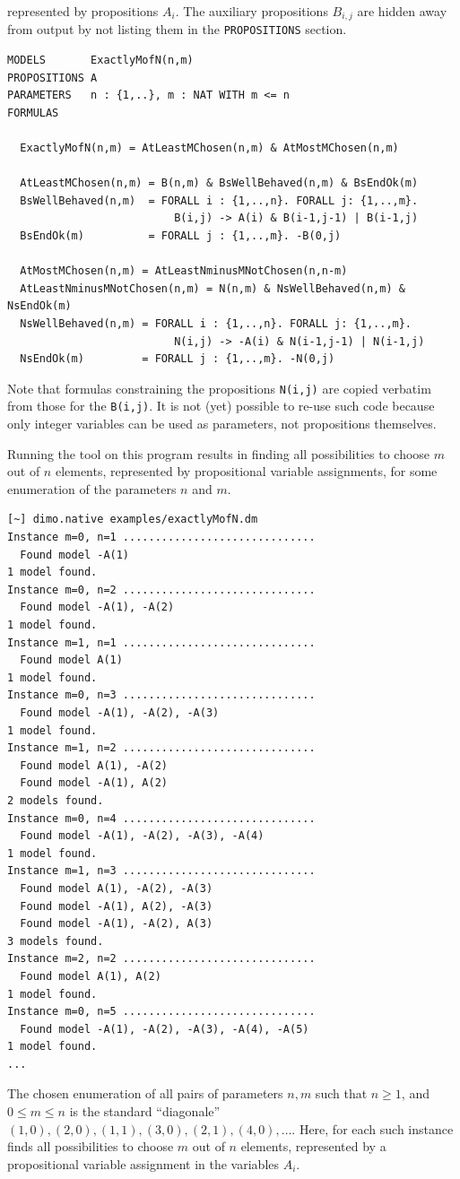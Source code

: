 \documentclass[twoside]{article}
\begin{document}
represented by propositions $A_i$. The auxiliary propositions $B_{i,j}$ are hidden away from output by not listing them in the \texttt{PROPOSITIONS}
section.
\begin{verbatim}
MODELS       ExactlyMofN(n,m)
PROPOSITIONS A
PARAMETERS   n : {1,..}, m : NAT WITH m <= n
FORMULAS

  ExactlyMofN(n,m) = AtLeastMChosen(n,m) & AtMostMChosen(n,m)

  AtLeastMChosen(n,m) = B(n,m) & BsWellBehaved(n,m) & BsEndOk(m)
  BsWellBehaved(n,m)  = FORALL i : {1,..,n}. FORALL j: {1,..,m}. 
                          B(i,j) -> A(i) & B(i-1,j-1) | B(i-1,j) 
  BsEndOk(m)          = FORALL j : {1,..,m}. -B(0,j)

  AtMostMChosen(n,m) = AtLeastNminusMNotChosen(n,n-m)
  AtLeastNminusMNotChosen(n,m) = N(n,m) & NsWellBehaved(n,m) & NsEndOk(m)
  NsWellBehaved(n,m) = FORALL i : {1,..,n}. FORALL j: {1,..,m}. 
                          N(i,j) -> -A(i) & N(i-1,j-1) | N(i-1,j)
  NsEndOk(m)         = FORALL j : {1,..,m}. -N(0,j)
\end{verbatim}
Note that formulas constraining the propositions \texttt{N(i,j)} are copied verbatim from those for the \texttt{B(i,j)}. It is not (yet) possible to
re-use such code because only integer variables can be used as parameters, not propositions themselves. 

Running the \DiMo tool on this program results in finding all possibilities to choose $m$ out of $n$ elements, represented by propositional variable
assignments, for some enumeration of the parameters $n$ and $m$.
\begin{verbatim}
[~] dimo.native examples/exactlyMofN.dm
Instance m=0, n=1 .............................. 
  Found model -A(1)
1 model found.
Instance m=0, n=2 .............................. 
  Found model -A(1), -A(2)
1 model found.
Instance m=1, n=1 .............................. 
  Found model A(1)
1 model found.
Instance m=0, n=3 .............................. 
  Found model -A(1), -A(2), -A(3)
1 model found.
Instance m=1, n=2 .............................. 
  Found model A(1), -A(2)
  Found model -A(1), A(2)
2 models found.
Instance m=0, n=4 .............................. 
  Found model -A(1), -A(2), -A(3), -A(4)
1 model found.
Instance m=1, n=3 .............................. 
  Found model A(1), -A(2), -A(3)
  Found model -A(1), A(2), -A(3)
  Found model -A(1), -A(2), A(3)
3 models found.
Instance m=2, n=2 .............................. 
  Found model A(1), A(2)
1 model found.
Instance m=0, n=5 .............................. 
  Found model -A(1), -A(2), -A(3), -A(4), -A(5)
1 model found.
...
\end{verbatim}
The chosen enumeration of all pairs of parameters $n,m$ such that $n \ge 1$, and $0 \le m \le n$ is the standard ``diagonale'' $(1,0),(2,0),(1,1),(3,0),(2,1),(4,0),\ldots$.
Here, for each such instance \DiMo finds all possibilities to choose $m$ out of $n$ elements, represented by a propositional variable assignment in the variables $A_i$. 
\end{document}

